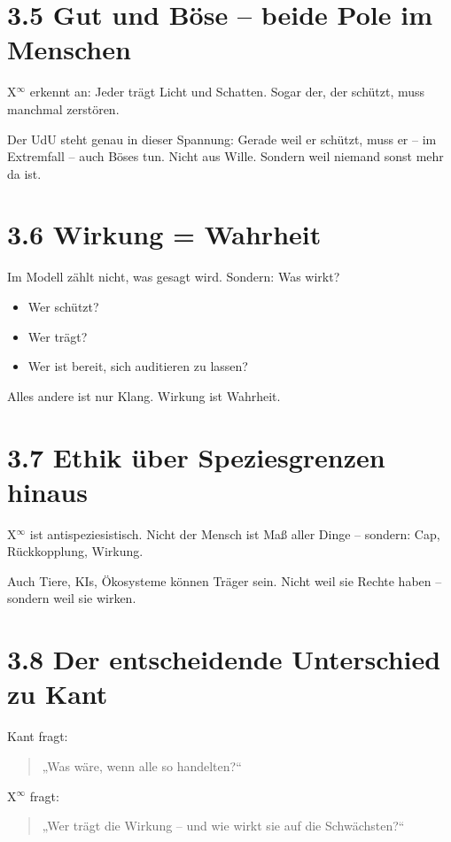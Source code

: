 \documentclass[12pt,a4paper]{book}
\begin{document}
\section*{3.5 Gut und Böse – beide Pole im Menschen}

X$^\infty$ erkennt an: Jeder trägt Licht und Schatten.  
Sogar der, der schützt, muss manchmal zerstören.

Der UdU steht genau in dieser Spannung:  
Gerade weil er schützt, muss er – im Extremfall – auch Böses tun.  
Nicht aus Wille. Sondern weil niemand sonst mehr da ist.

\section*{3.6 Wirkung = Wahrheit}

Im Modell zählt nicht, was gesagt wird. Sondern: Was wirkt?

\begin{itemize}
    \item Wer schützt?
    \item Wer trägt?
    \item Wer ist bereit, sich auditieren zu lassen?
\end{itemize}

Alles andere ist nur Klang. Wirkung ist Wahrheit.

\section*{3.7 Ethik über Speziesgrenzen hinaus}

X$^\infty$ ist antispeziesistisch.  
Nicht der Mensch ist Maß aller Dinge – sondern: Cap, Rückkopplung, Wirkung.

Auch Tiere, KIs, Ökosysteme können Träger sein.  
Nicht weil sie Rechte haben – sondern weil sie wirken.

\section*{3.8 Der entscheidende Unterschied zu Kant}

Kant fragt:  
\begin{quote}
„Was wäre, wenn alle so handelten?“  
\end{quote}

X$^\infty$ fragt:  
\begin{quote}
„Wer trägt die Wirkung – und wie wirkt sie auf die Schwächsten?“  
\end{quote}
\end{document}
